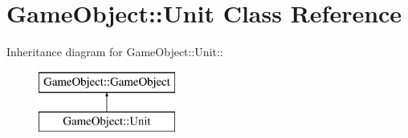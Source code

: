 \hypertarget{classGameObject_1_1Unit}{
\section{GameObject::Unit Class Reference}
\label{classGameObject_1_1Unit}
}
Inheritance diagram for GameObject::Unit::\begin{figure}[H]
\begin{center}
\leavevmode
\includegraphics[height=2cm]{classGameObject_1_1Unit}
\end{center}
\end{figure}

